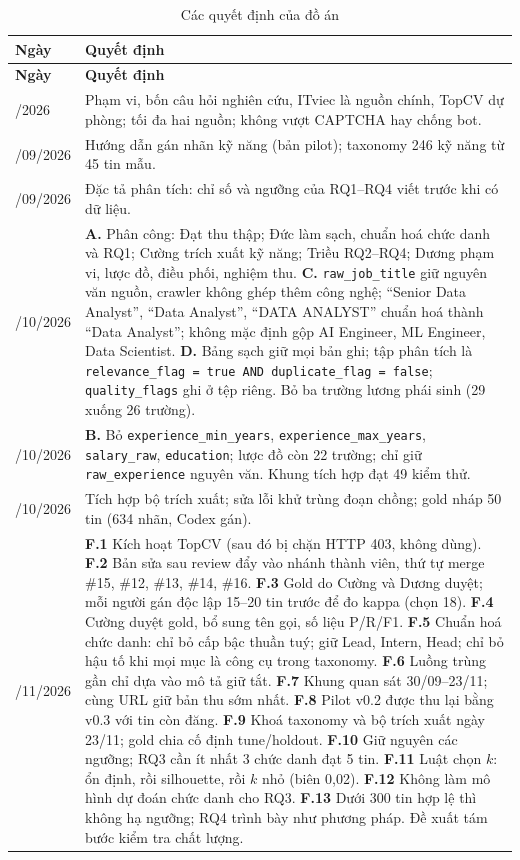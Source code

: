 \documentclass[12pt]{article}
\newcommand{\code}[1]{\texttt{#1}}
\begin{document}
\begin{longtable}{>{\raggedright\arraybackslash}p{2.2cm} >{\raggedright\arraybackslash}p{12.4cm}}
\caption{Các quyết định của đồ án}\label{tab:decisions}\\
\toprule
\textbf{Ngày} & \textbf{Quyết định} \\
\midrule
\endfirsthead
\toprule
\textbf{Ngày} & \textbf{Quyết định} \\
\midrule
\endhead
09/2026 & Phạm vi, bốn câu hỏi nghiên cứu, ITviec là nguồn chính, TopCV dự phòng; tối đa hai nguồn; không vượt CAPTCHA hay chống bot. \\
15/09/2026 & Hướng dẫn gán nhãn kỹ năng (bản pilot); taxonomy 246 kỹ năng từ 45 tin mẫu. \\
24/09/2026 & Đặc tả phân tích: chỉ số và ngưỡng của RQ1--RQ4 viết trước khi có dữ liệu. \\
03/10/2026 & \textbf{A.} Phân công: Đạt thu thập; Đức làm sạch, chuẩn hoá chức danh và RQ1; Cường trích xuất kỹ năng; Triều RQ2--RQ4; Dương phạm vi, lược đồ, điều phối, nghiệm thu. \textbf{C.} \code{raw\_job\_title} giữ nguyên văn nguồn, crawler không ghép thêm công nghệ; ``Senior Data Analyst'', ``Data Analyst'', ``DATA ANALYST'' chuẩn hoá thành ``Data Analyst''; không mặc định gộp AI Engineer, ML Engineer, Data Scientist. \textbf{D.} Bảng sạch giữ mọi bản ghi; tập phân tích là \code{relevance\_flag = true AND duplicate\_flag = false}; \code{quality\_flags} ghi ở tệp riêng. Bỏ ba trường lương phái sinh (29 xuống 26 trường). \\
04/10/2026 & \textbf{B.} Bỏ \code{experience\_min\_years}, \code{experience\_max\_years}, \code{salary\_raw}, \code{education}; lược đồ còn 22 trường; chỉ giữ \code{raw\_experience} nguyên văn. Khung tích hợp đạt 49 kiểm thử. \\
11/10/2026 & Tích hợp bộ trích xuất; sửa lỗi khử trùng đoạn chồng; gold nháp 50 tin (634 nhãn, Codex gán). \\
03/11/2026 & \textbf{F.1} Kích hoạt TopCV (sau đó bị chặn HTTP 403, không dùng). \textbf{F.2} Bản sửa sau review đẩy vào nhánh thành viên, thứ tự merge \#15, \#12, \#13, \#14, \#16. \textbf{F.3} Gold do Cường và Dương duyệt; mỗi người gán độc lập 15--20 tin trước để đo kappa (chọn 18). \textbf{F.4} Cường duyệt gold, bổ sung tên gọi, số liệu P/R/F1. \textbf{F.5} Chuẩn hoá chức danh: chỉ bỏ cấp bậc thuần tuý; giữ Lead, Intern, Head; chỉ bỏ hậu tố khi mọi mục là công cụ trong taxonomy. \textbf{F.6} Luồng trùng gần chỉ dựa vào mô tả giữ tắt. \textbf{F.7} Khung quan sát 30/09--23/11; cùng URL giữ bản thu sớm nhất. \textbf{F.8} Pilot v0.2 được thu lại bằng v0.3 với tin còn đăng. \textbf{F.9} Khoá taxonomy và bộ trích xuất ngày 23/11; gold chia cố định tune/holdout. \textbf{F.10} Giữ nguyên các ngưỡng; RQ3 cần ít nhất 3 chức danh đạt 5 tin. \textbf{F.11} Luật chọn $k$: ổn định, rồi silhouette, rồi $k$ nhỏ (biên 0,02). \textbf{F.12} Không làm mô hình dự đoán chức danh cho RQ3. \textbf{F.13} Dưới 300 tin hợp lệ thì không hạ ngưỡng; RQ4 trình bày như phương pháp. Đề xuất tám bước kiểm tra chất lượng. \\

\end{longtable}
\end{document}
